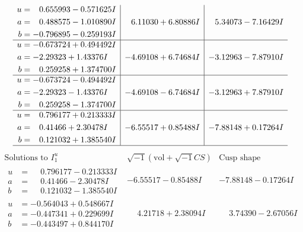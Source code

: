 \documentclass[1p]{elsarticle_modified}
\theoremstyle{definition}
\newcommand{\I}{\sqrt{-1}}
\begin{document}
$$\begin{array}{c|c|c}
\begin{aligned}
u &= \phantom{-}0.655993 - 0.571625 I \\
a &= \phantom{-}0.488575 - 1.010890 I \\
b &= -0.796895 - 0.259193 I\end{aligned}
 & \phantom{-}6.11030 + 6.80886 I & \phantom{-}5.34073 - 7.16429 I \\ \hline\begin{aligned}
u &= -0.673724 + 0.494492 I \\
a &= -2.29323 + 1.43376 I \\
b &= \phantom{-}0.259258 + 1.374700 I\end{aligned}
 & -4.69108 + 6.74684 I & -3.12963 - 7.87910 I \\ \hline\begin{aligned}
u &= -0.673724 - 0.494492 I \\
a &= -2.29323 - 1.43376 I \\
b &= \phantom{-}0.259258 - 1.374700 I\end{aligned}
 & -4.69108 - 6.74684 I & -3.12963 + 7.87910 I \\ \hline\begin{aligned}
u &= \phantom{-}0.796177 + 0.213333 I \\
a &= \phantom{-}0.41466 + 2.30478 I \\
b &= \phantom{-}0.121032 + 1.385540 I\end{aligned}
 & -6.55517 + 0.85488 I & -7.88148 + 0.17264 I\\
 \hline 
 \end{array}$$\newpage$$\begin{array}{c|c|c}  
\text{Solutions to }I^u_{1}& \I (\text{vol} + \sqrt{-1}CS) & \text{Cusp shape}\\
 \hline 
\begin{aligned}
u &= \phantom{-}0.796177 - 0.213333 I \\
a &= \phantom{-}0.41466 - 2.30478 I \\
b &= \phantom{-}0.121032 - 1.385540 I\end{aligned}
 & -6.55517 - 0.85488 I & -7.88148 - 0.17264 I \\ \hline\begin{aligned}
u &= -0.564043 + 0.548667 I \\
a &= -0.447341 + 0.229699 I \\
b &= -0.443497 + 0.844170 I\end{aligned}
 & \phantom{-}4.21718 + 2.38094 I & \phantom{-}3.74390 - 2.67056 I \\ \hline\begin{aligned}

\end{aligned}
\end{array}$$
\end{document}

